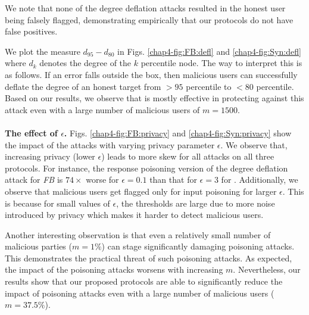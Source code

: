 We note that none of the degree deflation attacks resulted in the honest user being falsely flagged, demonstrating empirically  that our protocols do not have false positives.

We plot the measure $d_{95}-d_{80}$ in Figs. \ref{chap4-fig:FB:defl} and \ref{chap4-fig:Syn:defl} where $d_{k}$ denotes the degree of the $k$ percentile node. The way to interpret this is as follows. If an error falls outside the box, then malicious users can successfully deflate the degree of an honest target from $>95$ percentile to $<80$ percentile. Based on our results, we observe that \DegHybrid{} is mostly effective in protecting against this attack even with a large number of malicious users of $m=1500$. 
\vspace{-0.2cm}\\\\
\noindent\textbf{The effect of $\epsilon$.} Figs. \ref{chap4-fig:FB:privacy} and \ref{chap4-fig:Syn:privacy} show the impact of the attacks with varying privacy parameter $\epsilon$. We observe that, increasing privacy (lower $\epsilon$) leads to more skew for all attacks on all three protocols. For instance, the response poisoning version of the degree deflation attack for \textit{FB}  is $74\times$ worse for $\epsilon=0.1$ than that for $\epsilon=3$ for \DegRRCheck{}. Additionally, we observe that malicious users get flagged only for input poisoning for larger $\epsilon$. This is because for small values of $\epsilon$, the thresholds are large due to more noise introduced by privacy which makes it harder to detect malicious users. 
\par Another interesting observation is that even a relatively small number of malicious parties ($m=1\%$) can stage significantly damaging poisoning attacks. This demonstrates the practical threat of such poisoning attacks. As expected, the impact of the poisoning attacks worsens with increasing $m$. Nevertheless, our results show that our proposed protocols are able to significantly reduce the impact of poisoning attacks even with a large number of malicious users ($m=37.5\%$).

